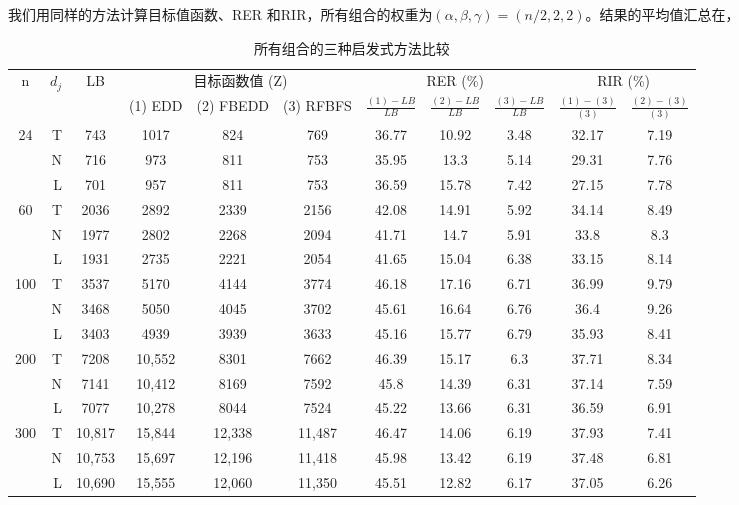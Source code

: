 我们用同样的方法计算目标值函数、RER 和RIR，所有组合的权重为$(\alpha,\beta,\gamma) = (n/2,2,2)$。结果的平均值汇总在，
\begin{table}[h]
  \centering\xiaowu
  \caption{所有组合的三种启发式方法比较}
    \begin{tabular}{crccccccccc}
    \toprule
    \multirow{2}[4]{*}{n} & \multicolumn{1}{c}{\multirow{2}[4]{*}{$d_j$}} & \multirow{2}[4]{*}{LB} & \multicolumn{3}{c}{目标函数值 (Z)} & \multicolumn{3}{c}{RER (\%)} & \multicolumn{2}{c}{RIR (\%)} \\
    \cline{4-11}
          & \multicolumn{1}{c}{} &       & (1) EDD & (2) FBEDD & (3) RFBFS &$\frac{(1) - LB}{LB}$ & $\frac{(2) - LB}{LB}$ & $\frac{(3) - LB}{LB}$ &$\frac{(1) - (3)}{(3)}$ & $\frac{(2) - (3)}{(3)}$\\
      \midrule    
    \multirow{3}[1]{*}{24} & T     & 743   & 1017  & 824   & 769   & 36.77 & 10.92 & 3.48  & 32.17 & 7.19 \\
          & N     & 716   & 973   & 811   & 753   & 35.95 & 13.3  & 5.14  & 29.31 & 7.76 \\
          & L     & 701   & 957   & 811   & 753   & 36.59 & 15.78 & 7.42  & 27.15 & 7.78 \\[3pt]
    \multirow{3}[0]{*}{60} & T     & 2036  & 2892  & 2339  & 2156  & 42.08 & 14.91 & 5.92  & 34.14 & 8.49 \\
          & N     & 1977  & 2802  & 2268  & 2094  & 41.71 & 14.7  & 5.91  & 33.8  & 8.3 \\
          & L     & 1931  & 2735  & 2221  & 2054  & 41.65 & 15.04 & 6.38  & 33.15 & 8.14 \\[3pt]
    \multirow{3}[0]{*}{100} & T     & 3537  & 5170  & 4144  & 3774  & 46.18 & 17.16 & 6.71  & 36.99 & 9.79 \\
          & N     & 3468  & 5050  & 4045  & 3702  & 45.61 & 16.64 & 6.76  & 36.4  & 9.26 \\
          & L     & 3403  & 4939  & 3939  & 3633  & 45.16 & 15.77 & 6.79  & 35.93 & 8.41 \\[3pt]
    \multirow{3}[0]{*}{200} & T     & 7208  & 10,552 & 8301  & 7662  & 46.39 & 15.17 & 6.3   & 37.71 & 8.34 \\
          & N     & 7141  & 10,412 & 8169  & 7592  & 45.8  & 14.39 & 6.31  & 37.14 & 7.59 \\
          & L     & 7077  & 10,278 & 8044  & 7524  & 45.22 & 13.66 & 6.31  & 36.59 & 6.91 \\[3pt]
    \multirow{3}[1]{*}{300} & T     & 10,817 & 15,844 & 12,338 & 11,487 & 46.47 & 14.06 & 6.19  & 37.93 & 7.41 \\
          & N     & 10,753 & 15,697 & 12,196 & 11,418 & 45.98 & 13.42 & 6.19  & 37.48 & 6.81 \\
          & L     & 10,690 & 15,555 & 12,060 & 11,350 & 45.51 & 12.82 & 6.17  & 37.05 & 6.26 \\
    \bottomrule
    \end{tabular}
  \label{tab:allcompare}
\end{table}
